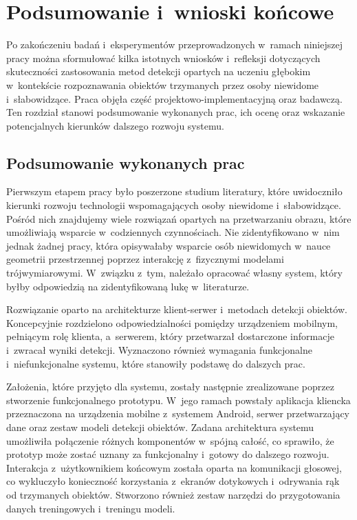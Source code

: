 \chapter{Podsumowanie i~wnioski końcowe}
\label{c:podsumowanie}

Po zakończeniu badań i~eksperymentów przeprowadzonych w~ramach niniejszej pracy można sformułować kilka istotnych wniosków i~refleksji dotyczących skuteczności zastosowania metod detekcji opartych na uczeniu głębokim w~kontekście rozpoznawania obiektów trzymanych przez osoby niewidome i~słabowidzące. Praca objęła część projektowo-implementacyjną oraz badawczą. Ten rozdział stanowi podsumowanie wykonanych prac, ich ocenę oraz wskazanie potencjalnych kierunków dalszego rozwoju systemu.

\section{Podsumowanie wykonanych prac}

Pierwszym etapem pracy było poszerzone studium literatury, które uwidoczniło kierunki rozwoju technologii wspomagających osoby niewidome i~słabowidzące. Pośród nich znajdujemy wiele rozwiązań opartych na przetwarzaniu obrazu, które umożliwiają wsparcie w~codziennych czynnościach. Nie zidentyfikowano w~nim jednak żadnej pracy, która opisywałaby wsparcie osób niewidomych w~nauce geometrii przestrzennej poprzez interakcję z~fizycznymi modelami trójwymiarowymi. W~związku z~tym, należało opracować własny system, który byłby odpowiedzią na zidentyfikowaną lukę w~literaturze.

Rozwiązanie oparto na architekturze klient-serwer i~metodach detekcji obiektów. Koncepcyjnie rozdzielono odpowiedzialności pomiędzy urządzeniem mobilnym, pełniącym rolę klienta, a~serwerem, który przetwarzał dostarczone informacje i~zwracał wyniki detekcji. Wyznaczono również wymagania funkcjonalne i~niefunkcjonalne systemu, które stanowiły podstawę do dalszych prac.

Założenia, które przyjęto dla systemu, zostały następnie zrealizowane poprzez stworzenie funkcjonalnego prototypu. W~jego ramach powstały aplikacja kliencka przeznaczona na urządzenia mobilne z~systemem Android, serwer przetwarzający dane oraz zestaw modeli detekcji obiektów. Zadana architektura systemu umożliwiła połączenie różnych komponentów w~spójną całość, co sprawiło, że prototyp może zostać uznany za funkcjonalny i~gotowy do dalszego rozwoju. Interakcja z~użytkownikiem końcowym została oparta na komunikacji głosowej, co wykluczyło konieczność korzystania z~ekranów dotykowych i~odrywania rąk od trzymanych obiektów. Stworzono również zestaw narzędzi do przygotowania danych treningowych i~treningu modeli.

